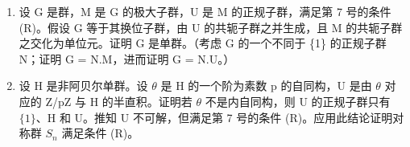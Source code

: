 \begin{enumerate}
\def\labelenumi{\arabic{enumi})}
\setcounter{enumi}{27}
\item
  设 G 是群，M 是 G 的极大子群，U 是 M 的正规子群，满足第 7 号的条件 (R)。假设 G 等于其换位子群，由 U 的共轭子群之并生成，且 M 的共轭子群之交化为单位元。证明 G 是单群。（考虑 G 的一个不同于 \{1\} 的正规子群 N；证明 G = N.M，进而证明 G = N.U。）
\item
  设 H 是非阿贝尔单群。设 \(\theta\) 是 H 的一个阶为素数 p 的自同构，U 是由 \(\theta\) 对应的 Z/pZ 与 H 的半直积。证明若 \(\theta\) 不是内自同构，则 U 的正规子群只有 \(\{1\}\)、H 和 U。推知 U 不可解，但满足第 7 号的条件 (R)。应用此结论证明对称群 \(S_{n}\) 满足条件 (R)。
\end{enumerate}

